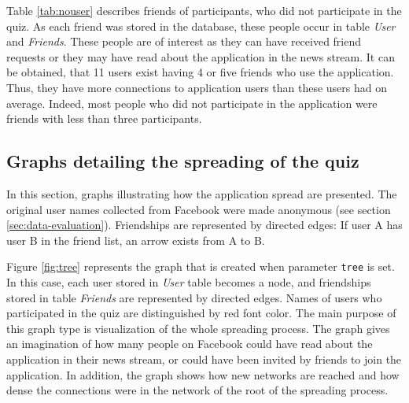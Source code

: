 \documentclass[preprint,12pt]{elsarticle}
\begin{document}
Table \ref{tab:nouser} describes friends of participants, who did not
participate in the quiz. As each friend was stored in the database, these people
occur in table \textit{User} and \textit{Friends}. These people are of
interest as they can have received friend requests
or they may have read about the application in the news
stream. 
It can be obtained, that 11 users exist having 4 or five friends who
use the application. Thus, they have more connections to application
users than these users had on average. Indeed, most people who did not participate in the
application were friends with less than three participants.







\subsection{Graphs detailing the spreading of the quiz}
\label{sec:distribution-quiz}
In this section, graphs illustrating how the
application spread are presented. The original user names collected
from Facebook were made anonymous
 (see section \ref{sec:data-evaluation}). Friendships are
represented by directed edges: If user A has user B in the friend list, an
arrow exists from A to B.

Figure \ref{fig:tree} represents the graph that is created when
parameter \verb|tree| is set. In this case, each user stored in \textit{User}
table becomes a node, and friendships stored in table \textit{Friends}
are represented by directed edges. Names of users who participated in the quiz are distinguished by
red font color. The main purpose of this graph type is visualization
of the whole spreading process. 
The graph gives an imagination of how many 
people on Facebook could have read about the application in their 
news stream, or could have been invited by friends to join the
application. In addition, the graph shows how new networks are
reached and how dense the connections were in the network of the root
of the spreading process.
\end{document}
